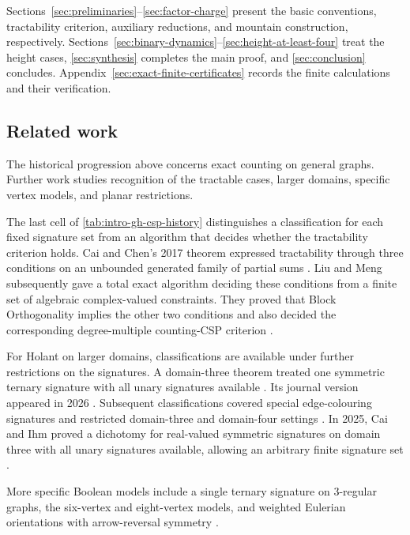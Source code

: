 \documentclass[11pt,letterpaper,onecolumn]{article}
\theoremstyle{plain}
\theoremstyle{definition}
\theoremstyle{remark}
\begin{document}
Sections~\ref{sec:preliminaries}--\ref{sec:factor-charge} present the basic
conventions, tractability criterion, auxiliary reductions, and mountain
construction, respectively.
Sections~\ref{sec:binary-dynamics}--\ref{sec:height-at-least-four} treat
the height cases, \cref{sec:synthesis} completes the main proof, and
\cref{sec:conclusion} concludes.
Appendix~\ref{sec:exact-finite-certificates} records the finite
calculations and their verification.

\subsection{Related work}
\label{subsec:related-work}

The historical progression above concerns exact counting on general
graphs.  Further work studies recognition of the tractable cases, larger
domains, specific vertex models, and planar restrictions.

The last cell of \cref{tab:intro-gh-csp-history} distinguishes a
classification for each fixed signature set from an algorithm that decides
whether the tractability criterion holds.  Cai and Chen's 2017 theorem expressed tractability
through three conditions on an unbounded generated family of partial sums
\cite{CaiChen2017}.  Liu and Meng subsequently gave a total exact algorithm
deciding these conditions from a finite set of algebraic complex-valued
constraints.  They proved that Block Orthogonality implies the other two
conditions and also decided the corresponding degree-multiple
counting-CSP criterion \cite{LiuMeng2026CSPDecidability}.

For Holant on larger domains, classifications are available under further
restrictions on the signatures.  A domain-three theorem treated one
symmetric ternary signature with all unary signatures available
\cite{CaiLuXia2013Domain3}. Its journal version appeared in 2026
\cite{CaiLuXia2026Domain3}.  Subsequent classifications covered special
edge-colouring signatures and restricted domain-three and domain-four
settings \cite{CaiGuoWilliams2016EdgeColoring,LiuFanCai2025}.  In 2025,
Cai and Ihm proved a dichotomy for real-valued symmetric signatures on
domain three with all unary signatures available, allowing an arbitrary
finite signature set \cite{CaiIhm2025}.

More specific Boolean models include a single ternary signature on
3-regular graphs, the six-vertex and eight-vertex models, and weighted
Eulerian orientations with arrow-reversal symmetry
\cite{YangHuangFu2024,CaiFuXia2018,CaiFu2023,CaiFuShao2020ARS}.
\end{document}
